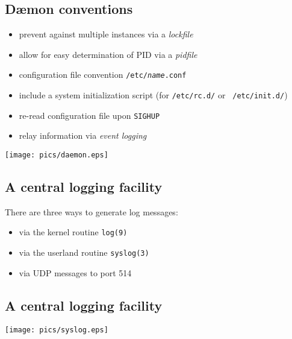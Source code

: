\documentclass[xga]{xdvislides}
\begin{document}
\subsection{D\ae mon conventions}
\begin{itemize}
	\item prevent against multiple instances via a {\em lockfile}
	\item allow for easy determination of PID via a {\em pidfile}
	\item configuration file convention {\tt /etc/{\em name}.conf}
	\item include a system initialization script (for {\tt /etc/rc.d/} or {\tt
		/etc/init.d/})
	\item re-read configuration file upon {\tt SIGHUP}
	\item relay information via {\em event logging}
\end{itemize}

\vfill
\hfill\texttt{[image: pics/daemon.eps]} \\


\subsection{A central logging facility}

There are three ways to generate log messages:
\begin{itemize}
	\item via the kernel routine {\tt log(9)}
	\item via the userland routine {\tt syslog(3)}
	\item via UDP messages to port 514
\end{itemize}

\subsection{A central logging facility}
\begin{center}
	\texttt{[image: pics/syslog.eps]}
\end{center}
\end{document}
